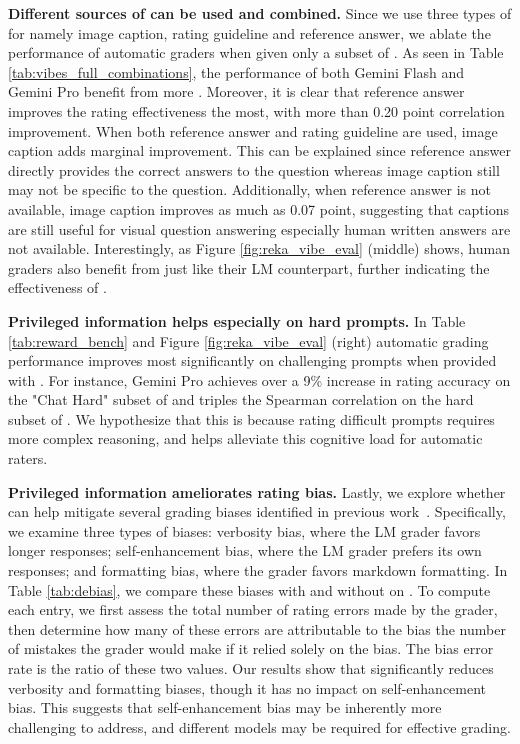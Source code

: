\textbf{Different sources of \PI can be used and combined.} Since we use three types of \PI for \VibeEval namely image caption, rating guideline and reference answer, we ablate the performance of automatic graders when given only a subset of \PI. As seen in Table \ref{tab:vibes_full_combinations}, the performance of both Gemini Flash and Gemini Pro benefit from more \PI. Moreover, it is clear that reference answer improves the rating effectiveness the most, with more than 0.20 point correlation improvement. When both reference answer and rating guideline are used, image caption adds marginal improvement. This can be explained since reference answer directly provides the correct answers to the question whereas image caption still may not be specific to the question. Additionally, when reference answer is not available, image caption improves as much as 0.07 point, suggesting that captions are still useful for visual question answering especially human written answers are not available. Interestingly, as Figure \ref{fig:reka_vibe_eval} (middle) shows, human graders also benefit from \PI just like their LM counterpart, further indicating the effectiveness of \PI.

\textbf{Privileged information helps especially on hard prompts.} In Table \ref{tab:reward_bench} and Figure \ref{fig:reka_vibe_eval} (right) automatic grading performance improves most significantly on challenging prompts when provided with \PI. For instance, Gemini Pro achieves over a 9\% increase in rating accuracy on the "Chat Hard" subset of \RewardBench and triples the Spearman correlation on the hard subset of \VibeEval. We hypothesize that this is because rating difficult prompts requires more complex reasoning, and \PI helps alleviate this cognitive load for automatic raters.



\textbf{Privileged information ameliorates rating bias.} Lastly, we explore whether \PI can help mitigate several grading biases identified in previous work~\citep{Zheng2023-mh}. Specifically, we examine three types of biases: verbosity bias, where the LM grader favors longer responses; self-enhancement bias, where the LM grader prefers its own responses; and formatting bias, where the grader favors markdown formatting. In Table \ref{tab:debias}, we compare these biases with and without \PI on \VibeEval. To compute each entry, we first assess the total number of rating errors made by the grader, then determine how many of these errors are attributable to the bias \ie the number of mistakes the grader would make if it relied solely on the bias. The bias error rate is the ratio of these two values. Our results show that \PI significantly reduces verbosity and formatting biases, though it has no impact on self-enhancement bias. This suggests that self-enhancement bias may be inherently more challenging to address, and different models may be required for effective grading.

